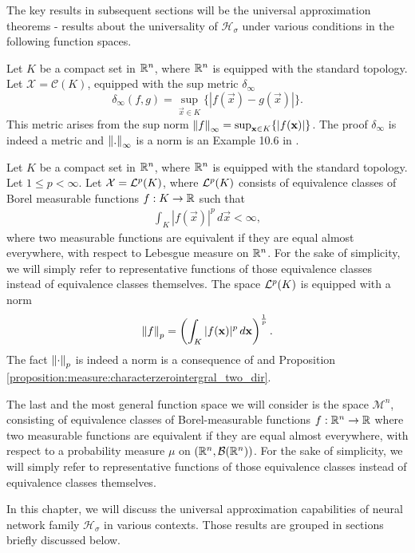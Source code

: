 The key results in subsequent sections will be the universal approximation theorems - results about the universality of $\mathcal{H}_\sigma$ under various conditions in the following function spaces.
\begin{example}
Let $K$ be a compact set in ${\mathbb R}^n$, where ${\mathbb R}^n$ is equipped with the standard topology.
Let $\mathcal{X} = \mathcal{C}(K)$, equipped with the sup metric $\delta_\infty$
\[
    \delta_\infty(f, g) = \sup_{\vec{x} \in K} \{ | f(\vec{x}) - g(\vec{x}) | \}.
\]
This metric arises from the sup norm $\left\lVert f\right\rVert_\infty = \sup_{\mathbf{x} \in K} \{ | f(\mathbf{x}) |\}$.
The proof $\delta_\infty$ is indeed a metric and $\left\lVert.\right\rVert_{\infty}$ is a norm is an Example 10.6 in \cite{wade_2014_introduction}.
\end{example}
\begin{example}
Let $K$ be a compact set in ${\mathbb R}^n$, where ${\mathbb R}^n$ is equipped with the standard topology. Let $1 \leq p < \infty$.
Let $\mathcal{X} = {\mathcal {L}^p}(K)$, where ${\mathcal {L}^p}(K)$ consists of equivalence classes of Borel measurable functions $f : K \to {\mathbb R}$ such that
\begin{align*}
    \int_{K} |f (\vec{x})| ^ p \,d\vec{x} < \infty,
\end{align*}
where two measurable functions are equivalent if they are equal almost everywhere, with respect to Lebesgue measure on ${\mathbb R}^n$.
For the sake of simplicity, we will simply refer to representative functions of those equivalence classes instead of equivalence classes themselves.
The space ${\mathcal {L}^p}(K)$ is equipped with a norm \[
    \left\lVert f\right\rVert_p = \left ( \int_{K} |f (\mathbf{x})| ^ p \,d\mathbf{x} \right )^{\frac{1}{p}}.
\]
The fact $ \left\lVert\cdot\right\rVert_p $ is indeed a norm is a consequence of  and Proposition \ref{proposition:measure:characterzerointergral_two_dir}. 
\end{example}
\begin{example}
The last and the most general function space we will consider is the space $\mathcal{M}^n$, consisting of equivalence classes of Borel-measurable functions $f : {\mathbb R}^n \to {\mathbb R}$  where two measurable functions are equivalent if they are equal almost everywhere, with respect to a probability measure $\mu$ on $({\mathbb R}^n, \mathcal{B}({\mathbb R}^n))$.
For the sake of simplicity, we will simply refer to representative functions of those equivalence classes instead of equivalence classes themselves.
\end{example}
In this chapter, we will discuss the universal approximation capabilities of neural network family $\mathcal{H}_\sigma$ in various contexts. Those results are grouped in sections briefly discussed below.
